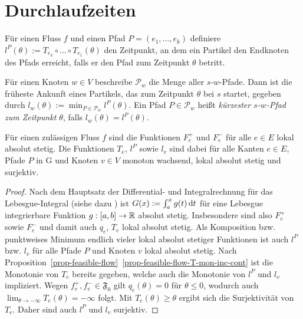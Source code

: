 \section{Durchlaufzeiten}

\begin{definition}
	Für einen Fluss $f$ und einen Pfad $P=(e_1,\dots,e_k)$ definiere $l^P(\theta):=T_{e_k}\circ\dots\circ T_{e_1}(\theta)$ den Zeitpunkt, an dem ein Partikel den Endknoten des Pfads erreicht, falls er den Pfad zum Zeitpunkt $\theta$ betritt.
	
	Für einen Knoten $w\in V$ beschreibe $\mathcal{P}_w$ die Menge aller $s$-$w$-Pfade.
	Dann ist die früheste Ankunft eines Partikels, das zum Zeitpunkt $\theta$ bei $s$ startet, gegeben durch $l_w(\theta):=\min_{P\in\mathcal{P}_w}l^P(\theta)$.
	Ein Pfad $P\in \mathcal{P}_w$ heißt \emph{kürzester $s$-$w$-Pfad zum Zeitpunkt $\theta$},  falls $l_w(\theta)=l^P(\theta)$.
\end{definition}

\begin{proposition}\label{prop-abs-cont-sur}
	Für einen zulässigen Fluss $f$ sind die Funktionen $F_e^+$ und $F_e^-$ für alle $e\in E$ lokal absolut stetig.
	Die Funktionen $T_e$, $l^P$ sowie $l_v$ sind dabei für alle Kanten $e\in E$, Pfade $P$ in G und Knoten $v\in V$ monoton wachsend, lokal absolut stetig und surjektiv.
\end{proposition}
\begin{proof}
	Nach dem Hauptsatz der Differential- und Integralrechnung für das Lebesgue-Integral (siehe dazu \cite[4.14]{Elstrodt2011}) ist $G(x):= \int_a^x g(t) \mathop{}\!\mathrm{d} t$ für eine Lebesgue integrierbare Funktion $g: [a,b] \to \mathbb{R}$ absolut stetig.
	Insbesondere sind also $F_e^+$ sowie $F_e^-$ und damit auch $q_e$, $T_e$ lokal absolut stetig.
	Als Komposition bzw. punktweises Minimum endlich vieler lokal absolut stetiger Funktionen ist auch $l^P$ bzw. $l_v$ für alle Pfade $P$ und Knoten $v$ lokal absolut stetig.
	Nach Proposition~\ref{prop-feasible-flow}~\ref{prop-feasible-flow-T-mon-inc-cont} ist die Monotonie von $T_e$ bereits gegeben, welche auch die Monotonie von $l^P$ und $l_v$ impliziert.
	Wegen $f_e^+, f_e^-\in\mathfrak{F_0}$ gilt $q_e(\theta)=0$ für $\theta\leq 0$, wodurch auch $\lim_{\theta\to-\infty} T_e(\theta) = - \infty$ folgt.
	Mit $T_e(\theta)\geq \theta$ ergibt sich die Surjektivität von $T_e$.
	Daher sind auch $l^P$ und $l_v$ surjektiv.
\end{proof}


